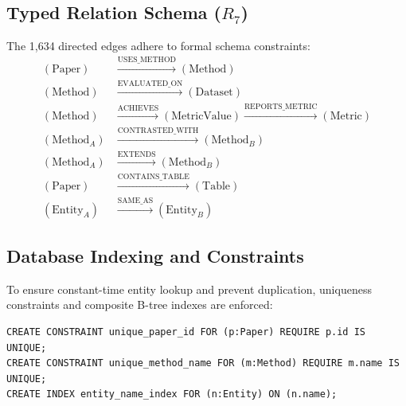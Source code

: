 \subsection{Typed Relation Schema ($R_7$)}
The 1,634 directed edges adhere to formal schema constraints:
\begin{equation}
\begin{aligned}
    (\text{Paper}) &\xrightarrow{\text{USES\_METHOD}} (\text{Method}) \\
    (\text{Method}) &\xrightarrow{\text{EVALUATED\_ON}} (\text{Dataset}) \\
    (\text{Method}) &\xrightarrow{\text{ACHIEVES}} (\text{MetricValue}) \xrightarrow{\text{REPORTS\_METRIC}} (\text{Metric}) \\
    (\text{Method}_A) &\xrightarrow{\text{CONTRASTED\_WITH}} (\text{Method}_B) \\
    (\text{Method}_A) &\xrightarrow{\text{EXTENDS}} (\text{Method}_B) \\
    (\text{Paper}) &\xrightarrow{\text{CONTAINS\_TABLE}} (\text{Table}) \\
    (\text{Entity}_A) &\xrightarrow{\text{SAME\_AS}} (\text{Entity}_B)
\end{aligned}
\end{equation}

\subsection{Database Indexing and Constraints}
To ensure constant-time entity lookup and prevent duplication, uniqueness constraints and composite B-tree indexes are enforced:
\begin{verbatim}
CREATE CONSTRAINT unique_paper_id FOR (p:Paper) REQUIRE p.id IS UNIQUE;
CREATE CONSTRAINT unique_method_name FOR (m:Method) REQUIRE m.name IS UNIQUE;
CREATE INDEX entity_name_index FOR (n:Entity) ON (n.name);
\end{verbatim}

